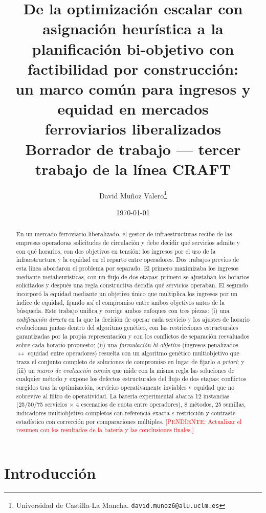 \documentclass[11pt,a4paper]{article}
\title{De la optimización escalar con asignación heurística a la\\
planificación bi-objetivo con factibilidad por construcción:\\
un marco común para ingresos y equidad en mercados\\
ferroviarios liberalizados\\
\large Borrador de trabajo --- tercer trabajo de la línea CRAFT}
\author{David Muñoz Valero\thanks{Universidad de Castilla-La Mancha.
\texttt{david.munoz6@alu.uclm.es}}}
\date{\today}
\newcommand{\pendiente}[1]{\textcolor{red}{[PENDIENTE: #1]}}
\begin{document}
\maketitle

\begin{abstract}
En un mercado ferroviario liberalizado, el gestor de infraestructuras
recibe de las empresas operadoras solicitudes de circulación y debe decidir
qué servicios admite y con qué horarios, con dos objetivos en tensión: los
ingresos por el uso de la infraestructura y la equidad en el reparto entre
operadores. Dos trabajos previos de esta línea abordaron el problema por
separado. El primero maximizaba los ingresos mediante metaheurísticas, con
un flujo de dos etapas: primero se ajustaban los horarios solicitados y
después una regla constructiva decidía qué servicios operaban. El segundo
incorporó la equidad mediante un objetivo único que multiplica los ingresos
por un índice de equidad, fijando así el compromiso entre ambos objetivos
antes de la búsqueda. Este trabajo unifica y corrige ambos enfoques con
tres piezas: (i) una \emph{codificación directa} en la que la decisión de
operar cada servicio y los ajustes de horario evolucionan juntas dentro del
algoritmo genético, con las restricciones estructurales garantizadas por la
propia representación y con los conflictos de separación reevaluados sobre
cada horario propuesto; (ii) una \emph{formulación bi-objetivo} (ingresos
penalizados $\leftrightarrow$ equidad entre operadores) resuelta con un
algoritmo genético multiobjetivo que traza el conjunto completo de
soluciones de compromiso en lugar de fijarlo \emph{a priori}; y (iii) un
\emph{marco de evaluación común} que mide con la misma regla las soluciones
de cualquier método y expone los defectos estructurales del flujo de dos
etapas: conflictos surgidos tras la optimización, servicios operativamente
inviables y equidad que no sobrevive al filtro de operatividad. La batería
experimental abarca 12 instancias (25/50/75 servicios $\times$ 4 escenarios
de cuota entre operadores), 8 métodos, 25 semillas, indicadores
multiobjetivo completos con referencia exacta $\varepsilon$-restricción y
contraste estadístico con corrección por comparaciones múltiples.
\pendiente{Actualizar el resumen con los resultados de la batería y las
conclusiones finales.}
\end{abstract}

\tableofcontents

\section{Introducción}
\label{sec:introduccion}
\end{document}
